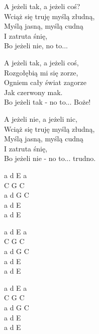 
\begin{text}
    A jeżeli tak, a jeżeli coś?\\
    Wciąż się truję myślą złudną,\\
    Myślą jasną, myślą cudną\\
    I zatruta śnię,\\
    Bo jeżeli nie, no to...

    A jeżeli tak, a jeżeli coś,\\
    Rozgołębią mi się zorze,\\
    Ogniem cały świat zagorze\\
    Jak czerwony mak.\\
    Bo jeżeli tak - no to... Boże!

    A jeżeli nie, a jeżeli nic,\\
    Wciąż się truję myślą złudną,\\
    Myślą jasną, myślą cudną\\
    I zatruta śnię,\\
    Bo jeżeli nie - no to... trudno.
\end{text}
\begin{chord}
    a d E a\\
    C G C\\
    a d G C\\
    a d E\\
    a d E

    a d E a\\
    C G C\\
    a d G C\\
    a d E\\
    a d E

    a d E a\\
    C G C\\
    a d G C\\
    a d E\\
    a d E
\end{chord}